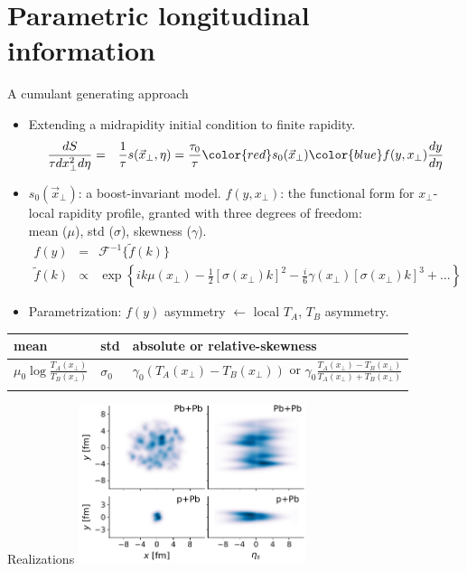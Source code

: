 \documentclass[11pt]{beamer}
\begin{document}
\section{Parametric longitudinal information}
\begin{frame}{A cumulant generating approach}
\begin{itemize}
\item Extending a midrapidity initial condition to finite rapidity.
\begin{eqnarray}\nonumber 
\frac{dS}{\tau dx_\perp^2d \eta} &=& \frac{1}{\tau}s(\vec{x}_\perp, \eta) =  \frac{\tau_0}{\tau} {\color{red} s_0(\vec{x}_\perp)} {\color{blue}f(y, x_\perp)} \frac{dy}{d\eta}
\end{eqnarray} 
\item {\color{red} $s_0(\vec{x}_\perp)$}: a boost-invariant model. {\color{blue} $f(y, x_\perp)$}: the functional form for $x_\perp$-local rapidity profile, granted with three degrees of freedom: \\
mean ($\mu$), std ($\sigma$), skewness ($\gamma$).
\begin{eqnarray}\nonumber 
f(y) &=& \mathcal{F}^{-1}\{\tilde{f}(k)\}	\\ \nonumber 
\tilde{f}(k) &\propto & \exp\left\{ik\mu(x_\perp) -\frac{1}{2}[\sigma(x_\perp) k]^2 - \frac{i}{6}\gamma(x_\perp)[\sigma(x_\perp) k]^3 + ...\right\}
\end{eqnarray}
\item Parametrization: $f(y)$ asymmetry $\leftarrow$ local $T_A$, $T_B$ asymmetry.
\end{itemize}
\begin{center}
\begin{tabularx}{0.95\textwidth}{p{2.5cm}p{}p{8cm}}
\hline
mean & std & absolute or relative-skewness \\
\hline
\noalign{\smallskip}
$\mu_0 \log\frac{T_A(x_\perp)}{T_B(x_\perp)}$ & $\sigma_0$ & $\gamma_0(T_A(x_\perp)-T_B(x_\perp))$ or $\gamma_0\frac{T_A(x_\perp)-T_B(x_\perp)}{T_A(x_\perp)+T_B(x_\perp)}$ \\
\noalign{\smallskip}
\hline
\end{tabularx}
\end{center}
\end{frame}

\begin{frame}{Realizations}
\includegraphics[width=0.5\textwidth]{trento3d_example.pdf}
\end{frame}
\end{document}
